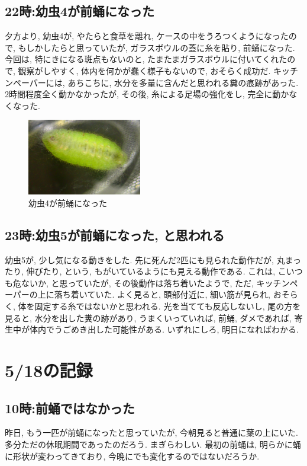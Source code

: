 \documentclass{jsarticle}
\begin{document}
\subsection{22時:幼虫4が前蛹になった}
夕方より, 幼虫4が, やたらと食草を離れ, ケースの中をうろつくようになったので, 
もしかしたらと思っていたが, ガラスボウルの蓋に糸を貼り, 前蛹になった. 
今回は, 特にきになる斑点もないのと, たまたまガラスボウルに付いてくれたので, 観察がしやすく, 
体内を何かが蠢く様子もないので, おそらく成功だ. 
キッチンペーパーには, あちこちに, 水分を多量に含んだと思われる糞の痕跡があった. 
2時間程度全く動かなかったが, その後, 糸による足場の強化をし, 完全に動かなくなった. 
\begin{figure}[htbp]
  \begin{center}
    \includegraphics[width=5cm]{photo4/prePupa.JPG}
  \end{center}
  \caption{幼虫4が前蛹になった}
\end{figure}

\subsection{23時:幼虫5が前蛹になった, と思われる}
幼虫5が, 少し気になる動きをした. 先に死んだ2匹にも見られた動作だが, 
丸まったり, 伸びたり, という, もがいているようにも見える動作である. 
これは, こいつも危ないか, と思っていたが, その後動作は落ち着いたようで, ただ, キッチンペーパーの上に落ち着いていた. 
よく見ると, 頭部付近に, 細い筋が見られ, おそらく, 体を固定する糸ではないかと思われる. 
光を当てても反応しないし, 尾の方を見ると, 水分を出した糞の跡があり, うまくいっていれば, 前蛹, 
ダメであれば, 寄生中が体内でうごめき出した可能性がある. 
いずれにしろ, 明日になればわかる. 

\section{5/18の記録}
\subsection{10時:前蛹ではなかった}
昨日, もう一匹が前蛹になったと思っていたが, 今朝見ると普通に葉の上にいた. 
多分ただの休眠期間であったのだろう. まぎらわしい. 
最初の前蛹は, 明らかに蛹に形状が変わってきており, 今晩にでも変化するのではないだろうか. 
\end{document}
